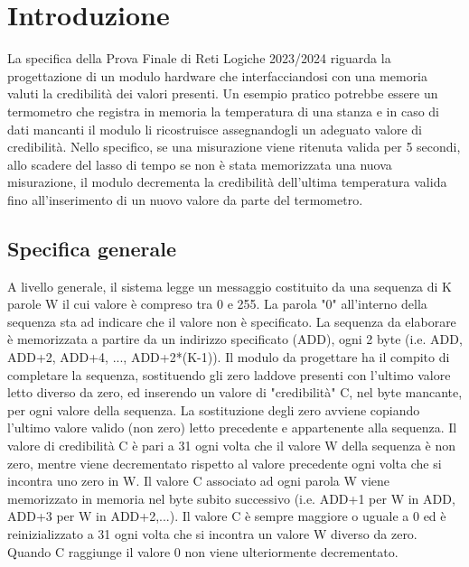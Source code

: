 \section{Introduzione}
La specifica della Prova Finale di Reti Logiche 2023/2024 riguarda la progettazione di un modulo hardware che interfacciandosi con una memoria valuti la credibilità dei valori presenti.
\newline
Un esempio pratico potrebbe essere un termometro che registra in memoria la temperatura di una stanza e in caso di dati mancanti il modulo li ricostruisce assegnandogli un adeguato valore di credibilità. Nello specifico, se una misurazione viene ritenuta valida per 5 secondi, allo scadere del lasso di tempo se non è stata memorizzata una nuova misurazione, il modulo decrementa la credibilità dell'ultima temperatura valida fino all'inserimento di un nuovo valore da parte del termometro.

\subsection{Specifica generale}
A livello generale, il sistema legge un messaggio costituito da una sequenza di K parole W il cui valore è compreso tra 0 e 255. La parola "0" all'interno della sequenza sta ad indicare che il valore non è specificato. La sequenza da elaborare è memorizzata a partire da un indirizzo specificato (ADD), ogni 2 byte (i.e. ADD, ADD+2, ADD+4, ..., ADD+2*(K-1)).
\newline
Il modulo da progettare ha il compito di completare la sequenza, sostituendo gli zero laddove presenti con l'ultimo valore letto diverso da zero, ed inserendo un valore di "credibilità" C, nel byte mancante, per ogni valore della sequenza. La sostituzione degli zero avviene copiando l'ultimo valore valido (non zero)
letto precedente e appartenente alla sequenza. Il valore di credibilità C è pari a 31 ogni volta che il valore W della sequenza è non zero, mentre viene decrementato rispetto al valore precedente ogni volta che si incontra uno zero in W. Il valore C associato ad ogni parola W viene memorizzato in memoria nel byte subito successivo (i.e. ADD+1 per W in ADD, ADD+3 per W in ADD+2,...). Il valore C è sempre maggiore o uguale a 0 ed è reinizializzato a 31 ogni volta che si incontra un valore W diverso da zero. Quando C raggiunge il valore 0 non viene ulteriormente decrementato.
\newline

